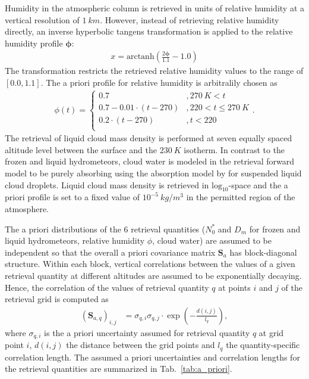 \documentclass[journal abbreviation, manuscript]{copernicus}
\begin{document}
Humidity in the atmospheric column is retrieved in units of relative humidity at
a vertical resolution of $1\ \unit{km}$. However, instead of retrieving relative
humidity directly, an inverse hyperbolic tangens transformation is applied to
the relative humidity profile $\mathbf{\phi}$:
%
\begin{align}
x = \text{arctanh}(\frac{2 \mathbf{\phi}}{1.1} - 1.0)
\end{align}
%
The transformation restricts the retrieved relative humidity values to
the range of $[0.0, 1.1]$. The a priori profile for relative humidity
is arbitralily chosen as
%
\begin{align}
\phi(t) = \begin{cases}
 0.7 &, 270\ \unit{K} < t \\
 0.7 - 0.01 \cdot (t - 270) & ,220 < t \leq  270\ \unit{K} \\
 0.2 \cdot (t - 270) & ,t < 220 \\
 \end{cases}.
\end{align}
%
The retrieval of liquid cloud mass density is performed at seven equally spaced
altitude level between the surface and the $230\ \unit{K}$ isotherm. In contrast
to the frozen and liquid hydrometeors, cloud water is modeled in the retrieval
forward model to be purely absorbing using the absorption model by
\cite{liebe92} for suspended liquid cloud droplets. Liquid cloud mass density is
retrieved in $\text{log}_{10}$-space and the a priori profile is set to a fixed
value of $10^{-5}\ \unit{kg / m^3}$ in the permitted region of the atmosphere.

The a priori distributions of the 6 retrieval quantities ($N_0^*$ and $D_m$ for
frozen and liquid hydrometeors, relative humidity $\phi$, cloud water) are
assumed to be independent so that the overall a priori covariance matrix
$\mathbf{S}_a$ has block-diagonal structure. Within each block, vertical
correlations between the values of a given retrieval quantity at different
altitudes are assumed to be exponentially decaying. Hence, the correlation of
the values of retrieval quantity $q$ at points $i$ and $j$ of the retrieval grid
is computed as
%
\begin{align}
\left ( \mathbf{S}_{a,q} \right )_{i, j} &= \sigma_{q,i} \sigma_{q,j}
 \cdot \exp  \left ( -\frac{d(i, j)}{l_q} \right ),
\end{align}
%
where $\sigma_{q, i}$ is the a priori uncertainty assumed for retrieval
quantity $q$ at grid point $i$, $d(i, j)$ the distance between the grid
points and $l_q$ the quantity-specific correlation length. The assumed
a priori uncertainties and correlation lengths for the retrieval quantities
are summarized in Tab.~\ref{tab:a_priori}.
\end{document}

